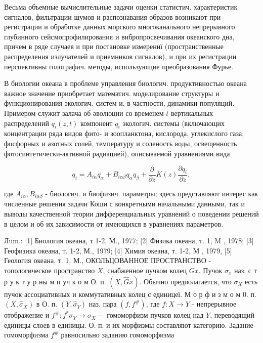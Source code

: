 \documentclass[10pt]{article}
\begin{document}
Весьма объемные вычислительные задачи оценки статистич. характеристик сигналов, фильтрации шумов и распознавания образов возникают при регистрации и обработке данных морского многоканального непрерывного глубинного сейсмопрофилирования и вибропросвечивания океанского дна, причем в ряде случаев и при постановке измерениї (пространственные распределения излучателей и приемников сигналов), и при их регистрации перспективны голографич. методы, использующие преобразования Фурье.



В биологии океана в проблеме управления биологич. продуктивностью океана важное значение приобретает математич. моделирование структуры и функционирования экологич. систем и, в частности, динамики популяций. Примером служит залача об әволюции со временем $t$ вертикальных распределений $q_{i}(z, t)$ компонент $q_{i}$ экологич. системы (включающих концентрации ряда видов фито- и зоопланктона, кислорода, углекислого газа, фосфорных и азотных солей, температуру и соленость воды, освещенность фотосинтетически-активной радиацией), описываемой уравнениями вида



\[

q_{i}=A_{i \alpha} q_{\alpha}+B_{i \alpha \beta} q_{\alpha} q_{\beta}+\frac{\partial}{\partial z} K(z) \frac{\partial q_{i}}{\partial z},

\]



где $A_{i \alpha}, B_{i \alpha \beta}$ - биологич. и биофизич. параметры; здесь представляют интерес как численные рөшения задачи Коши с конкретными начальными данными, так и выводы качественной теории дифференциальных уравнений о поведении решений в целом и об их зависимости от имеющихся в уравнениях параметров.



Лum.: [1] Биология океана, т 1-2, М., 1977; [2] Физика океана, т. 1, M , 1978; [3] Геофизика океана, т. 1-2, М., 1979; [4] Химия океана, т. 1-2, М , 1979, [5] Геология океана, т. 1, М., ОКОЛЬЦОВАННОЕ ПРОСТРАНСТВО - топологическое пространство $X$, снабженное пучком колец $G x$. Пучок $\sigma_{x}$ наз. с т р у к т у р ны м п уч к о м О. п. $(X, \widehat{G} x)$. Обычно предполагается, что $\sigma_{X}$ есть пучок ассоциативных и коммутативных колец с единицеї. М о р ф и з м о м 0. п. $\left(X, \widehat{\sigma}_{X}\right)$ в О. п. $\left(Y, \widehat{\sigma}_{Y}\right)$ наз. пара $\left(f, f^{\#}\right)$, где $f: X \rightarrow Y$ - непрерывное отображение и $f^{\#}: f^{*} \sigma_{Y} \rightarrow \sigma_{X}-$ гомоморфизм пучков колец над $Y$, переводящий единицы слоев в единицы. О. п. и их морфизмы составляют категорию. Задание гомоморфизма $f^{\#}$ равносильно заданию гомоморфизма
\end{document}
